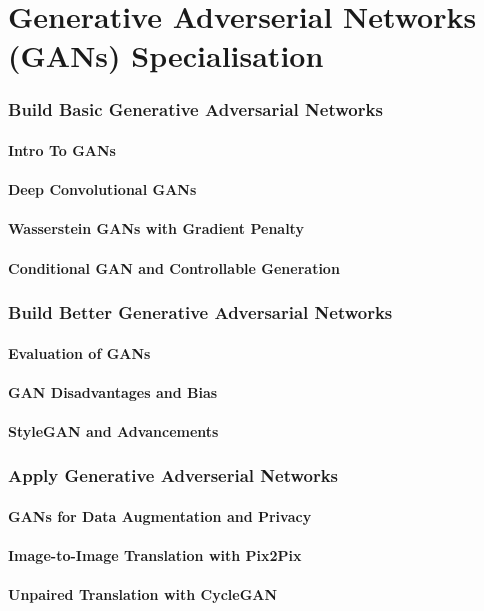 \part{Generative Adverserial Networks (GANs) Specialisation}

\section{Build Basic Generative Adversarial Networks}
\subsection{Intro To GANs}
\subsection{Deep Convolutional GANs}
\subsection{Wasserstein GANs with Gradient Penalty}
\subsection{Conditional GAN and Controllable Generation}

\section{Build Better Generative Adversarial Networks}
\subsection{Evaluation of GANs}
\subsection{GAN Disadvantages and Bias}
\subsection{StyleGAN and Advancements}

\section{Apply Generative Adverserial Networks}
\subsection{GANs for Data Augmentation and Privacy}
\subsection{Image-to-Image Translation with Pix2Pix}
\subsection{Unpaired Translation with CycleGAN}